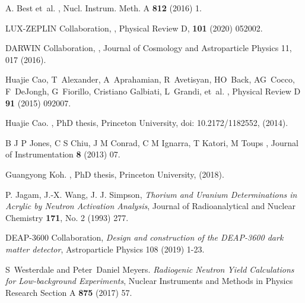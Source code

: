\documentclass[a4paper,11pt]{article}
\begin{document}
\begin{thebibliography}{99}
A. Best et~al.
, 
Nucl. Instrum. Meth. A {\bf 812} (2016) 1.

LUX-ZEPLIN Collaboration,
,
\newblock Physical Review D, {\bf 101}  (2020) 052002.

DARWIN Collaboration,
,
\newblock Journal of Cosmology and Astroparticle Physics 11, 017 (2016).

Huajie Cao, T~Alexander, A~Aprahamian, R~Avetisyan, HO~Back, AG~Cocco,
  F~DeJongh, G~Fiorillo, Cristiano Galbiati, L~Grandi, et~al.
,
\newblock Physical Review D {\bf 91} (2015) 092007.

Huajie Cao.
,
\newblock PhD thesis, Princeton University, doi: 10.2172/1182552, (2014).

B J P Jones, C S Chiu, J M Conrad, C M Ignarra, T Katori, M Toups
,
\newblock Journal of Instrumentation {\bf 8} (2013) 07.

Guangyong Koh.
,
\newblock PhD thesis, Princeton University, (2018).

P. Jagam, J.-X. Wang, J. J. Simpson, %
\emph {Thorium and Uranium Determinations in Acrylic by Neutron Activation Analysis}, 
Journal of Radioanalytical and Nuclear Chemistry {\bf 171}, No. 2 (1993) 277.

DEAP-3600 Collaboration, 
\emph {Design and construction of the {DEAP-3600} dark matter detector}, 
Astroparticle Physics 108 (2019) 1-23.

S~Westerdale and Peter~Daniel Meyers.
\newblock \emph{Radiogenic Neutron Yield Calculations for Low-background Experiments},
Nuclear Instruments and Methods in Physics Research Section A {\bf 875} (2017) 57.
  

\end{thebibliography}
\end{document}
